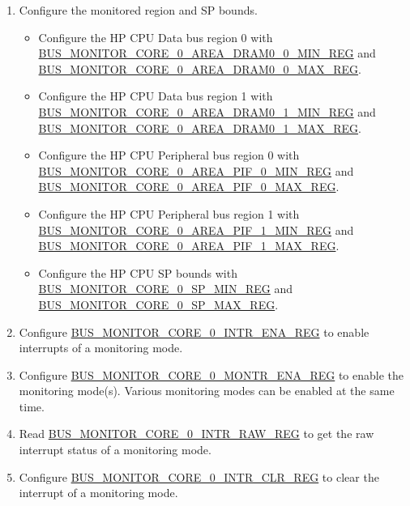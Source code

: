 \documentclass[main\_\_EN.tex]{subfiles}
\begin{document}
\begin{enumerate}
    \item Configure the monitored region and SP bounds.
        \begin{itemize}
            \item Configure the HP CPU Data bus region 0 with \hyperref[regdesc:BUSMONITORCORE0AREADRAM00MINREG]{BUS\_MONITOR\_CORE\_0\_AREA\_DRAM0\_0\_MIN\_REG} and  \hyperref[regdesc:BUSMONITORCORE0AREADRAM00MAXREG]{BUS\_MONITOR\_CORE\_0\_AREA\_DRAM0\_0\_MAX\_REG}. 
            \item Configure the HP CPU Data bus region 1 with \hyperref[regdesc:BUSMONITORCORE0AREADRAM01MINREG]{BUS\_MONITOR\_CORE\_0\_AREA\_DRAM0\_1\_MIN\_REG} and \hyperref[regdesc:BUSMONITORCORE0AREADRAM01MAXREG]{BUS\_MONITOR\_CORE\_0\_AREA\_DRAM0\_1\_MAX\_REG}.
            \item Configure the HP CPU Peripheral bus region 0 with \hyperref[regdesc:BUSMONITORCORE0AREAPIF0MINREG]{BUS\_MONITOR\_CORE\_0\_AREA\_PIF\_0\_MIN\_REG} and \hyperref[regdesc:BUSMONITORCORE0AREAPIF0MAXREG]{BUS\_MONITOR\_CORE\_0\_AREA\_PIF\_0\_MAX\_REG}.
            \item Configure the HP CPU Peripheral bus region 1 with \hyperref[regdesc:BUSMONITORCORE0AREAPIF1MINREG]{BUS\_MONITOR\_CORE\_0\_AREA\_PIF\_1\_MIN\_REG} and  \hyperref[regdesc:BUSMONITORCORE0AREAPIF1MAXREG]{BUS\_MONITOR\_CORE\_0\_AREA\_PIF\_1\_MAX\_REG}.
            \item Configure the HP CPU SP bounds with \hyperref[regdesc:BUSMONITORCORE0SPMINREG]{BUS\_MONITOR\_CORE\_0\_SP\_MIN\_REG} and \hyperref[regdesc:BUSMONITORCORE0SPMAXREG]{BUS\_MONITOR\_CORE\_0\_SP\_MAX\_REG}.
        \end{itemize}
    \item Configure \hyperref[regdesc:BUSMONITORCORE0INTRENAREG]{BUS\_MONITOR\_CORE\_0\_INTR\_ENA\_REG} to enable interrupts of a monitoring mode.
    \item Configure \hyperref[regdesc:BUSMONITORCORE0MONTRENAREG]{BUS\_MONITOR\_CORE\_0\_MONTR\_ENA\_REG} to enable the monitoring mode(s). Various monitoring modes can be enabled at the same time.
    \item Read \hyperref[regdesc:BUSMONITORCORE0INTRRAWREG]{BUS\_MONITOR\_CORE\_0\_INTR\_RAW\_REG} to get the raw interrupt status of a monitoring mode. 
    \item Configure \hyperref[regdesc:BUSMONITORCORE0INTRCLRREG]{BUS\_MONITOR\_CORE\_0\_INTR\_CLR\_REG} to clear the interrupt of a monitoring mode.
\end{enumerate}
\end{document}
